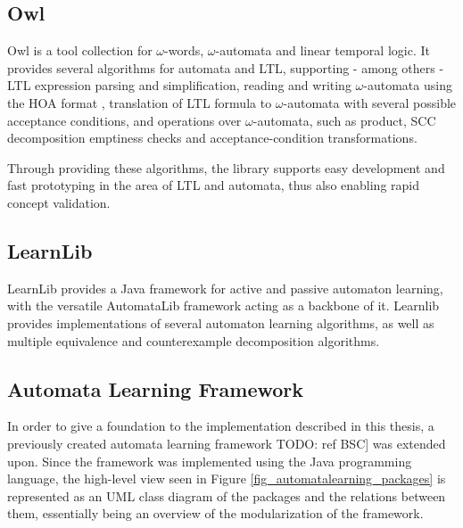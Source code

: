 \subsection{Owl} \label{subsec_owl}

Owl \cite{Owl} is a tool collection for $\omega$-words, $\omega$-automata and linear temporal logic. It provides several algorithms for automata and LTL, supporting - among others - LTL expression parsing and simplification, reading and writing $\omega$-automata using the HOA format \cite{HOAFormat}, translation of LTL formula to $\omega$-automata with several possible acceptance conditions, and operations over $\omega$-automata, such as product, SCC decomposition emptiness checks and acceptance-condition transformations.

Through providing these algorithms, the library supports easy development and fast prototyping in the area of LTL and automata, thus also enabling rapid concept validation.

\subsection{LearnLib} \label{subsec_learnlib}

LearnLib\cite{10.1007/978-3-319-21690-4_32} provides a Java framework for active and passive automaton learning, with the versatile AutomataLib framework acting as a backbone of it. Learnlib provides implementations of several automaton learning algorithms, as well as multiple equivalence and counterexample decomposition algorithms.

\subsection{Automata Learning Framework} \label{subsec_automatonlearning}
In order to give a foundation to the implementation described in this thesis, a previously created automata learning framework TODO: ref BSC] was extended upon. Since the framework was implemented using the Java programming language, the high-level view seen in Figure \ref{fig_automatalearning_packages} is represented as an UML class diagram of the packages and the relations between them, essentially being an overview of the modularization of the framework. 


